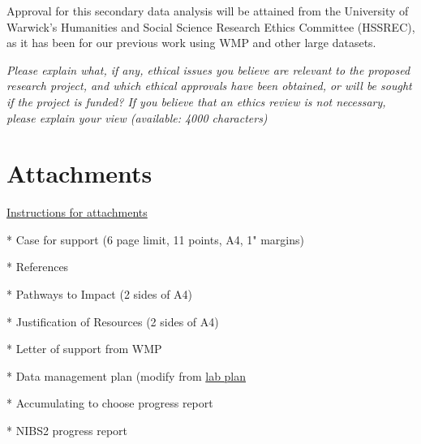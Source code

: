 \documentclass[11pt, a4paper]{article}
\begin{document}
Approval for this secondary data analysis will be attained from the University of Warwick's Humanities and Social Science Research Ethics Committee (HSSREC), as it has been for our previous work using WMP and other large datasets.

\textit{Please explain what, if any, ethical issues you believe are relevant to the proposed research project, and which ethical approvals have been obtained, or will be sought if the project is funded? If you believe that an ethics review is not necessary, please explain your view (available: 4000 characters)}


\section{Attachments}

\href{https://je-s.rcuk.ac.uk/Handbook/Index.htm#pages/GuidanceonCompletingaStandardG/CaseforSupportandAttachments/ESRCSpecificRequirements.htm}{Instructions for attachments}

* Case for support (6 page limit, 11 points, A4, 1" margins) 

* References

* Pathways to Impact (2 sides of A4) 

* Justification of Resources (2 sides of A4)

* Letter of support from WMP

* Data management plan (modify from \href{https://github.com/neil-stewart/data_management_plan}{lab plan}


* Accumulating to choose progress report

* NIBS2 progress report



\newpage



\end{document}
